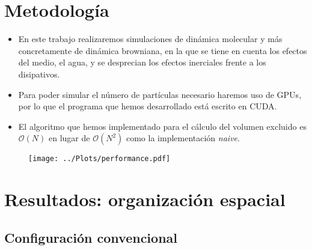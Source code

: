 \documentclass{beamer}
\begin{document}
\section{Metodología}

\begin{frame}
    \begin{itemize}
        \item En este trabajo realizaremos simulaciones de \alert{dinámica molecular} y más concretamente de \alert{dinámica browniana}, en la que se tiene en cuenta los efectos del medio, el agua, y se desprecian los efectos inerciales frente a los disipativos.
        \item Para poder simular el número de partículas necesario haremos uso de \alert{GPUs}, por lo que el programa que hemos desarrollado está escrito en \alert{CUDA}.
        \item El algoritmo que hemos implementado para el cálculo del \alert{volumen excluido} es $\mathcal{O}(N)$ en lugar de $\mathcal{O}(N^2)$ como la implementación \textit{naive}.
    \end{itemize}
    \begin{figure}
        \centering
        \texttt{[image: ../Plots/performance.pdf]}
    \end{figure}
\end{frame}

\section{Resultados: organización espacial}

\subsection{Configuración convencional}
\end{document}
